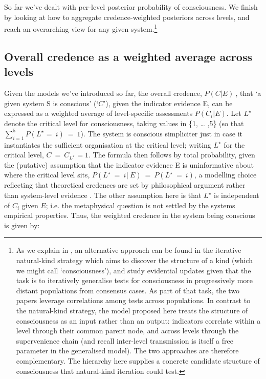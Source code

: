 \documentclass[11pt, a4paper, onecolumn, gdm]{google}
\begin{document}
So far we've dealt with per-level posterior probability of consciousness.
We finish  by looking at how to aggregate credence-weighted posteriors across levels, and reach an overarching view for any given system.\footnote{As we explain in , an alternative approach can be found in the iterative natural-kind strategy \citep{bayne2024,peters2026} which aims to discover the structure of a kind (which we might call `consciousness'), and study evidential updates given that the task is to iteratively generalise tests for consciousness in progressively more distant populations from consensus cases. As part of that task, the two papers leverage correlations among tests across populations. In contrast to the natural-kind strategy, the model proposed here treats the structure of consciousness as an input rather than an output: indicators correlate within a level through their common parent node, and across levels through the supervenience chain (and recall inter-level transmission is itself a free parameter in the generalised model). The two approaches are therefore complementary. The hierarchy here supplies a concrete candidate structure of consciousness that natural-kind iteration could test.}

\subsection{Overall credence as a weighted average across levels}\label{overall-credence-as-a-weighted-average-across-levels}

Given the models we've introduced so far, the overall credence, \(P(C|E)\ \), that `a given system S is conscious' (`\(C\)'), given the indicator evidence E, can be expressed as a weighted average of level-specific assessments \(P(C_{i}|E)\).
Let \({L^{\star}}^{}\) denote the critical level for consciousness, taking values in \{1, \ldots{} ,5\} (so that \(\sum_{i = 1}^{5}P({L^{\star}}_{} = \ i)\  = \ 1\)).
The system is conscious simpliciter just in case it instantiates the sufficient organisation at the critical level; writing \(L^{\star}\) for the critical level, \(C\  = \ C_{{L^{\star}}^{}} = 1\).
The formula then follows by total probability, given the (putative) assumption that the indicator evidence E is uninformative about where the critical level sits, \(P({L^{\star}\ = \ i}_{}|\ E)\ = \ P(L^{\star}\ = \ i)\), a modelling choice reflecting that theoretical credences are set by philosophical argument rather than system-level evidence \citep[see][for an alternative]{bayne2024}.
The other assumption here is that \(L^{\star}\) is independent of \(C_{i}\) given \(E\); i.e. the metaphysical question is not settled by the system\textquotesingle s empirical properties.
Thus, the weighted credence in the system being conscious is given by:
\end{document}
